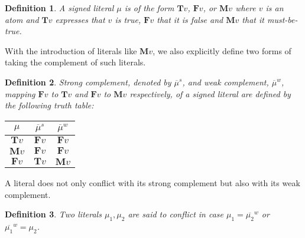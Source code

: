 \documentclass{vutinfth} %
\newtheorem{definition}{Definition}[section]
\newcommand{\mbt}{must-be-true\xspace}
\newcommand{\negstrong}[1]{\overline{#1}^s}
\newcommand{\negweak}[1]{\overline{#1}^w}
\newcommand{\bT}{\mathbf{T}}
\newcommand{\bM}{\mathbf{M}}
\newcommand{\bF}{\mathbf{F}}
\newcommand{\sgl}{\mu}
\newcommand{\bsgl}{\sigma}
\newcommand{\wkn}{\textit{weaken}}
\begin{document}
\begin{definition}
A \emph{signed literal} $\sgl$ is of the form $\bT v$, $\bF v$, or $\bM v$ where $v$ is an atom and $\bT v$ expresses that $v$ is \emph{true}, $\bF v$ that it is \emph{false} and $\bM v$ that it \emph{\mbt}.
\end{definition}



With the introduction of literals like $\bM v$, we also explicitly define two forms of taking the complement of such literals.

\begin{definition}
Strong complement, denoted by $\negstrong{\sgl}$, and weak complement, $\negweak{\sgl}$, mapping $\bF v$ to $\bT v$ and $\bF v$ to $\bM v$ respectively, of a signed literal are defined by the following truth table:%

\begin{center}
\begin{tabular}{|c|cc|}
\hline
$\sgl$&$\negstrong{\sgl}$&$\negweak{\sgl}$\\
\hline
\hline
$\bT v$&$\bF v$&$\bF v$\\
$\bM v$&$\bF v$&$\bF v$\\
$\bF v$&$\bT v$&$\bM v$\\
\hline
\end{tabular}
\end{center}
\end{definition}

A literal does not only conflict with its strong complement but also with its weak complement.

\begin{definition}
Two literals $\sgl_1, \sgl_2$ are said to \emph{conflict} in case $\sgl_1 = \negweak{\sgl_2}$ or $\negweak{\sgl_1} = \sgl_2$.
\end{definition}
\end{document}
